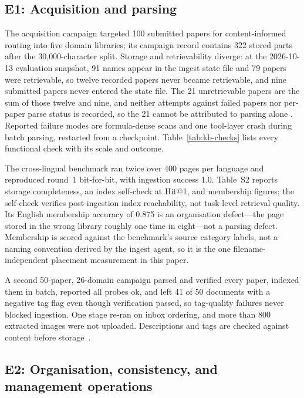 \subsection{E1: Acquisition and parsing}
\label{sec:e1}

The acquisition campaign targeted 100 submitted papers for content-informed
routing into five domain libraries; its campaign record contains 322 stored
parts after the 30{,}000-character split. Storage and retrievability diverge:
at the 2026-10-13 evaluation snapshot, 91 names appear
in the ingest state file and 79 papers were retrievable, so twelve recorded
papers never became retrievable, and nine submitted papers never entered the
state file. The 21 unretrievable papers are the sum of those twelve and nine,
and neither attempts against failed papers nor per-paper parse status is
recorded, so the 21 cannot be attributed to parsing alone
\cite{missier-prov-2013}. Reported failure modes are formula-dense scans and
one tool-layer crash during batch parsing, restarted from a checkpoint.
Table~\ref{tab:kb-checks} lists every functional check with its scale and
outcome.

The cross-lingual benchmark ran twice over 400 pages per language and
reproduced round~1 bit-for-bit, with ingestion success 1.0. Table~S2 reports
storage completeness, an index self-check at Hit@1, and membership figures;
the self-check verifies post-ingestion index reachability, not task-level
retrieval quality. Its English membership accuracy of 0.875 is an organisation
defect---the page stored in the wrong library roughly one time in eight---not
a parsing defect. Membership is scored against the benchmark's source category labels, not a
naming convention derived by the ingest agent, so it is the one
filename-independent placement measurement in this paper.

A second 50-paper, 26-domain campaign parsed and verified every paper, indexed
them in batch, reported all probes ok, and left 41 of 50 documents with a
negative tag flag even though verification passed, so tag-quality failures
never blocked ingestion.
One stage re-ran on inbox ordering, and more than 800 extracted images were
not uploaded. Descriptions and tags are checked against content before
storage~\cite{park-metadata-quality-2009}.


\subsection{E2: Organisation, consistency, and management operations}
\label{sec:e2}


